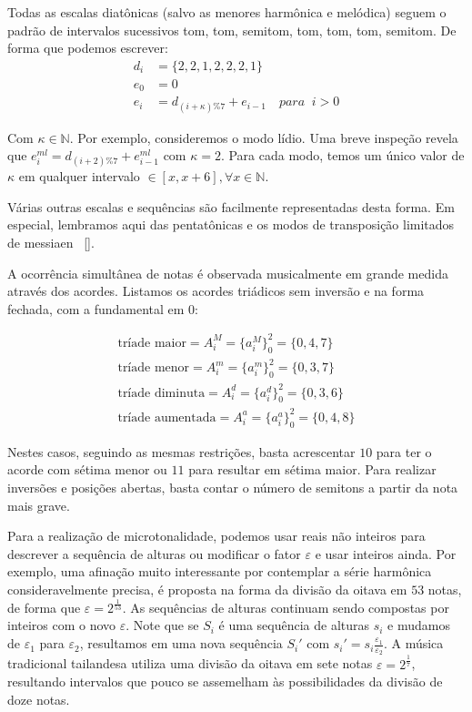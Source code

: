 Todas as escalas diatônicas (salvo as menores harmônica e melódica)
seguem o padrão de intervalos sucessivos
tom, tom, semitom, tom, tom, tom, semitom. De forma
que podemos escrever:
\begin{equation}
\begin{split}
d_i & =\{2,2,1,2,2,2,1\} \\
e_0 & =0 \\
e_i & =d_{(i+\kappa)\%7}+e_{i-1} \quad para \;\;  i > 0
\end{split}
\end{equation}

Com $\kappa \in \mathbb{N}$. Por exemplo, consideremos o modo lídio. Uma breve
inspeção revela que $e_i^{ml}=d_{(i+2)\%7}+e_{i-1}^{ml}$ com $\kappa=2$. Para cada
modo, temos um único valor de $\kappa$ em qualquer intervalo $\in [x,x+6], \forall x \in \mathbb{N}$.

Várias outras escalas e sequências são facilmente representadas desta forma. Em especial,
lembramos aqui das pentatônicas e os modos de transposição limitados de messiaen ~\ref{}.

A ocorrência simultânea de notas é observada musicalmente em grande medida
através dos acordes. Listamos os acordes triádicos sem inversão e na forma fechada,
com a fundamental em $0$:

\begin{equation}
\begin{split}
\text{tríade maior} = A_i^M= \{a_i^M\}_0^2=\{0,4,7\} \\ 
\text{tríade menor} = A_i^m = \{a_i^m\}_0^2=\{0,3,7\} \\
\text{tríade diminuta} = A_i^d = \{a_i^d\}_0^2=\{0,3,6\} \\
\text{tríade aumentada} = A_i^a = \{a_i^a\}_0^2=\{0,4,8\}
\end{split}
\end{equation}

Nestes casos, seguindo as mesmas restrições, basta acrescentar $10$ para ter o acorde
com sétima menor ou $11$ para resultar em sétima maior. Para realizar inversões e posições abertas,
basta contar o número de semitons a partir da nota mais grave.

Para a realização de microtonalidade, podemos usar reais não inteiros
para descrever a sequência de alturas ou modificar o fator $\varepsilon$
e usar inteiros ainda. Por exemplo, uma afinação muito
interessante por contemplar a série harmônica consideravelmente precisa,
é proposta na forma da divisão da oitava em $53$ notas, de forma
que $\varepsilon=2^{\frac{1}{53}}$. As sequências de alturas
continuam sendo compostas por inteiros com o novo $\varepsilon$.
Note que se $S_i$ é uma sequência de alturas $s_i$ e mudamos de $\varepsilon_1$ para
$\varepsilon_2$,
resultamos em uma nova sequência $S_i'$ com $s_i'=s_i \frac{\varepsilon_1}{\varepsilon_2}$.
A música tradicional tailandesa utiliza uma divisão da oitava em sete notas $\varepsilon=2^{\frac{1}{7}}$,
resultando intervalos que pouco se assemelham às possibilidades da
divisão de doze notas.


